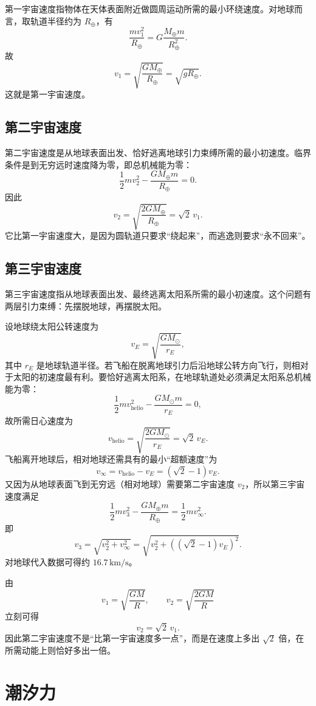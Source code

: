 第一宇宙速度指物体在天体表面附近做圆周运动所需的最小环绕速度。对地球而言，取轨道半径约为 $R_\oplus$，有
\[
\frac{mv_1^2}{R_\oplus}=G\frac{M_\oplus m}{R_\oplus^2}.
\]
故
\[
v_1=\sqrt{\frac{GM_\oplus}{R_\oplus}}=\sqrt{gR_\oplus}.
\]
这就是第一宇宙速度。

\subsection{第二宇宙速度}

第二宇宙速度是从地球表面出发、恰好逃离地球引力束缚所需的最小初速度。临界条件是到无穷远时速度降为零，即总机械能为零：
\[
\frac12 mv_2^2-\frac{GM_\oplus m}{R_\oplus}=0.
\]
因此
\[
v_2=\sqrt{\frac{2GM_\oplus}{R_\oplus}}=\sqrt{2}\,v_1.
\]
它比第一宇宙速度大，是因为圆轨道只要求“绕起来”，而逃逸则要求“永不回来”。

\subsection{第三宇宙速度}

第三宇宙速度指从地球表面出发、最终逃离太阳系所需的最小初速度。这个问题有两层引力束缚：先摆脱地球，再摆脱太阳。

设地球绕太阳公转速度为
\[
v_E=\sqrt{\frac{GM_\odot}{r_E}},
\]
其中 $r_E$ 是地球轨道半径。若飞船在脱离地球引力后沿地球公转方向飞行，则相对于太阳的初速度最有利。要恰好逃离太阳系，在地球轨道处必须满足太阳系总机械能为零：
\[
\frac12 m v_{\text{helio}}^2-\frac{GM_\odot m}{r_E}=0,
\]
故所需日心速度为
\[
v_{\text{helio}}=\sqrt{\frac{2GM_\odot}{r_E}}=\sqrt{2}\,v_E.
\]
飞船离开地球后，相对地球还需具有的最小“超额速度”为
\[
v_\infty=v_{\text{helio}}-v_E=(\sqrt{2}-1)v_E.
\]
又因为从地球表面飞到无穷远（相对地球）需要第二宇宙速度 $v_2$，所以第三宇宙速度满足
\[
\frac12 mv_3^2-\frac{GM_\oplus m}{R_\oplus}=\frac12 m v_\infty^2.
\]
即
\[
v_3=\sqrt{v_2^2+v_\infty^2}=\sqrt{v_2^2+\left((\sqrt2-1)v_E\right)^2}.
\]
对地球代入数据可得约 $16.7\,\text{km/s}$。

\begin{remark}
由
\[
v_1=\sqrt{\frac{GM}{R}},\qquad v_2=\sqrt{\frac{2GM}{R}}
\]
立刻可得
\[
v_2=\sqrt2\,v_1.
\]
因此第二宇宙速度不是“比第一宇宙速度多一点”，而是在速度上多出 $\sqrt2$ 倍，在所需动能上则恰好多出一倍。
\end{remark}

\section{潮汐力}

